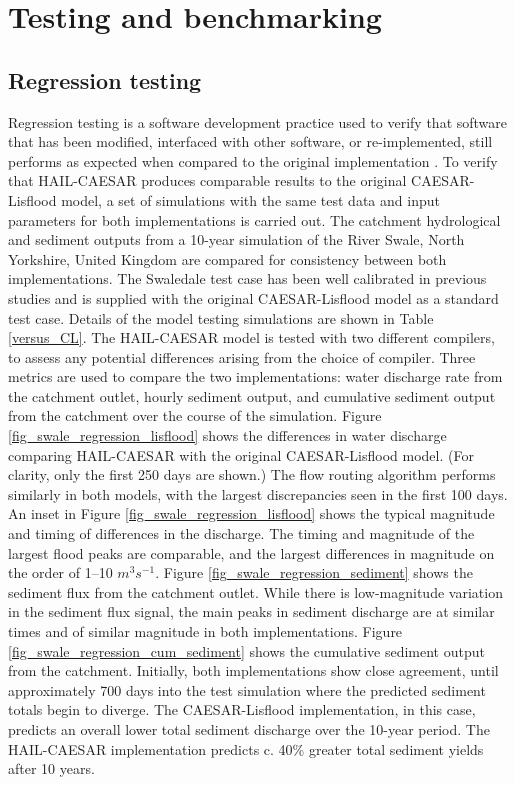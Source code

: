 \section{Testing and benchmarking}

\subsection{Regression testing}

Regression testing is a software development practice used to verify that software that has been modified, interfaced with other software, or re-implemented, still performs as expected when compared to the original implementation \citep{wong1997study}. To verify that HAIL-CAESAR produces comparable results to the original CAESAR-Lisflood model, a set of simulations with the same test data and input parameters for both implementations is carried out. The catchment hydrological and sediment outputs from a 10-year simulation of the River Swale, North Yorkshire, United Kingdom are compared for consistency between both implementations. The Swaledale test case has been well calibrated in previous studies \citep[e.g.,][]{Coulthard2001} and is supplied with the original CAESAR-Lisflood model as a standard test case. Details of the model testing simulations are shown in Table \ref{versus_CL}. The HAIL-CAESAR model is tested with two different compilers, to assess any potential differences arising from the choice of compiler. Three metrics are used to compare the two implementations: water discharge rate from the catchment outlet, hourly sediment output, and cumulative sediment output from the catchment over the course of the simulation. 
Figure \ref{fig_swale_regression_lisflood} shows the differences in water discharge comparing HAIL-CAESAR with the original CAESAR-Lisflood model. (For clarity, only the first 250 days are shown.) The flow routing algorithm performs similarly in both models, with the largest discrepancies seen in the first 100 days. An inset in Figure \ref{fig_swale_regression_lisflood} shows the typical magnitude and timing of differences in the discharge. The timing and magnitude of the largest flood peaks are comparable, and the largest differences in magnitude on the order of 1--10 \(m^3s^{-1}\).
Figure \ref{fig_swale_regression_sediment} shows the sediment flux from the catchment outlet. While there is low-magnitude variation in the sediment flux signal, the main peaks in sediment discharge are at similar times and of similar magnitude in both implementations. Figure \ref{fig_swale_regression_cum_sediment} shows the cumulative sediment output from the catchment. Initially, both implementations show close agreement, until approximately 700 days into the test simulation where the predicted sediment totals begin to diverge. The CAESAR-Lisflood implementation, in this case, predicts an overall lower total sediment discharge over the 10-year period. The HAIL-CAESAR implementation predicts c. 40\% greater total sediment yields after 10 years. 

